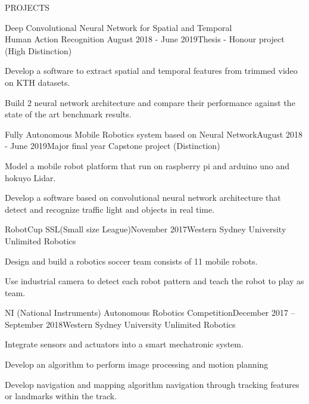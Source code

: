 \documentclass{resume} %
\begin{document}

\begin{rSection}{PROJECTS}

\begin{rSubsection}{Deep Convolutional Neural Network for Spatial and Temporal 
\\Human Action Recognition} {August 2018 - June 2019}{Thesis - Honour project (High Distinction)}{}

\item Develop a software to extract spatial and temporal features from trimmed video on KTH datasets.
\item Build 2 neural network architecture and compare their performance against the state of the art benchmark results.
\end{rSubsection}  


\begin{rSubsection}{Fully Autonomous Mobile Robotics system based on Neural Network}{August 2018 - June 2019}{Major final year Capstone project (Distinction)}{} 
\item Model a mobile robot platform that run on raspberry pi and arduino uno and hokuyo Lidar.
\item Develop a software based on convolutional neural network architecture that detect and recognize traffic light and objects in real time.   

\end{rSubsection}



\begin{rSubsection}{RobotCup SSL(Small size League)}{November 2017}{Western Sydney University Unlimited Robotics}

\item Design and build a robotics soccer team consists of 11 mobile robots.
\item Use industrial camera to detect each robot pattern and teach the robot to play as team.    

\end{rSubsection}


\begin{rSubsection}{NI (National Instruments) Autonomous Robotics Competition}{December 2017 – September 2018}{Western Sydney University Unlimited Robotics}{}    

\item Integrate sensors and actuators into a smart mechatronic system. 
\item Develop an algorithm to perform image processing and motion planning
\item Develop navigation and mapping algorithm navigation through tracking features or landmarks within the track.

\end{rSubsection} 

\end{rSection} 
\end{document}
